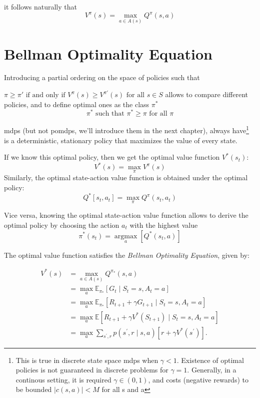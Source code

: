 it follows naturally that 
\[
    V^{\pi}(s)= \max _{a \in A(s)} Q^{\pi}(s, a)
\]

\section{Bellman Optimality Equation}

Introducing a partial ordering on the space of policies such that 

$\pi \geq \pi' \text{ if and only if } V^{\pi}(s) \geq V^{\pi'}(s) \text{ for all } s \in S$
allows to compare different policies, and to define optimal ones as the class $\pi^*$ 
$$\pi^* \text{ such that } \pi^* \geq \pi \text{ for all } \pi$$


\glspl{mdp} (but not \glspl{pomdp}, we'll introduce them in the next chapter), always have\footnote{This 
is true in discrete state space \gls{mdp}s when $\gamma < 1$. 
Existence of optimal policies is not guaranteed in discrete problems for $\gamma = 1$. Generally, in a continous setting, 
it is required $\gamma \in (0,1)$, and costs (negative rewards) to be bounded $|c(s,a)|<M$ for all s and a}
 is a 
deterministic, stationary policy that maximizes the value of every state. \cite{96ef8573-56cc-3a43-a4c7-3c6543c30f4e}
    
If we know this optimal policy, then we get the optimal value function $V^{*}(s_{t})$:
\[
V^{*}(s)=\max _{\pi}V^{\pi}(s)
\]
 Similarly, the optimal state-action value function is obtained under the optimal policy:
$$
Q^{*}\left[s_{t}, a_{t}\right]=\max _{\pi} Q^{\pi}\left(s_{t}, a_{t}\right)
$$

Vice versa, knowing the optimal state-action value function allows to derive the optimal policy by 
choosing the action \(a_{t}\) with the highest value
\[
\pi^*\left(s_{t}\right) = \underset{a}{\operatorname{argmax}}\left[Q^{*}\left(s_{t}, a\right)\right]
\]

The optimal value function satisfies the \textit{Bellman Optimality Equation}, given by:

\begin{align}
    V^{\ast }(s)&=\max\limits_{a\in A(s)}Q^{\pi _{\ast }}(s,a) \nonumber \\ 
    & =\max\limits_{a}\mathbb{E}_{\pi _{\ast }}[G_{t}\mid S_{t}=s,A_{t}=a] \nonumber \\ 
    & =\max\limits_{a}\mathbb{E}_{\pi _{\ast }}[R_{t+1}+\gamma G_{t+1}\mid
    S_{t}=s,A_{t}=a] \nonumber \\ 
    & =\max\limits_{a}\mathbb{E}[R_{t+1}+\gamma V^{\ast }(S_{t+1})\mid
    S_{t}=s,A_{t}=a] \nonumber \\ 
    & =\max\limits_{a}\sum\limits_{s^{\prime },r}p(s^{\prime
    },r\mid s,a)\left[ r+\gamma V^{\ast }(s^{\prime })\right].%
    \label{Bellman-optimality-eq}
\end{align}

